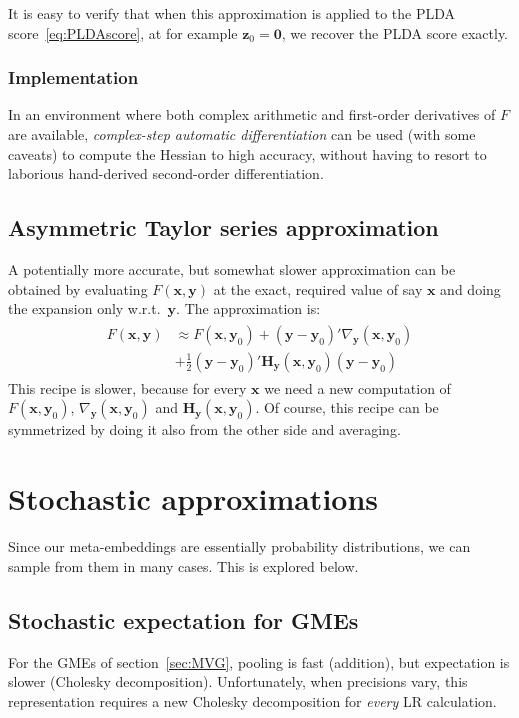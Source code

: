 \documentclass[a4paper,oneside,12pt,english]{report}
\def\zvec{\mathbf{z}}
\def\Hmat{\mathbf{H}}
\def\yvec{\mathbf{y}}
\def\xvec{\mathbf{x}}
\def\nulvec{\boldsymbol{0}}
\begin{document}
It is easy to verify that when this approximation is applied to the PLDA score~\eqref{eq:PLDAscore}, at for example $\zvec_0=\nulvec$, we recover the PLDA score exactly. 

\subsubsection{Implementation}
In an environment where both complex arithmetic and first-order derivatives of $F$ are available, \emph{complex-step automatic differentiation} can be used (with some caveats) to compute the Hessian to high accuracy, without having to resort to laborious hand-derived second-order differentiation. 


\subsection{Asymmetric Taylor series approximation}
A potentially more accurate, but somewhat slower approximation can be obtained by evaluating $F(\xvec,\yvec)$ at the exact, required value of say $\xvec$ and doing the expansion only w.r.t.\ $\yvec$. The approximation is:  
\begin{align}
\begin{split}
F(\xvec,\yvec) &\approx F(\xvec,\yvec_0) + (\yvec-\yvec_0)'\nabla_\yvec(\xvec,\yvec_0)\\
&+ \frac12(\yvec-\yvec_0)'\Hmat_\yvec(\xvec,\yvec_0)(\yvec-\yvec_0)
\end{split}
\end{align} 
This recipe is slower, because for every $\xvec$ we need a new computation of $F(\xvec,\yvec_0)$, $\nabla_\yvec(\xvec,\yvec_0)$ and $\Hmat_\yvec(\xvec,\yvec_0)$. Of course, this recipe can be symmetrized by doing it also from the other side and averaging.


\section{Stochastic approximations}
Since our meta-embeddings are essentially probability distributions, we can sample from them in many cases. This is explored below.


\subsection{Stochastic expectation for GMEs}
\def\tvec{\mathbf{t}}
For the GMEs of section~\ref{sec:MVG}, pooling is fast (addition), but expectation is slower (Cholesky decomposition). Unfortunately, when precisions vary, this representation requires a new Cholesky decomposition for \emph{every} LR calculation. 
\end{document}
